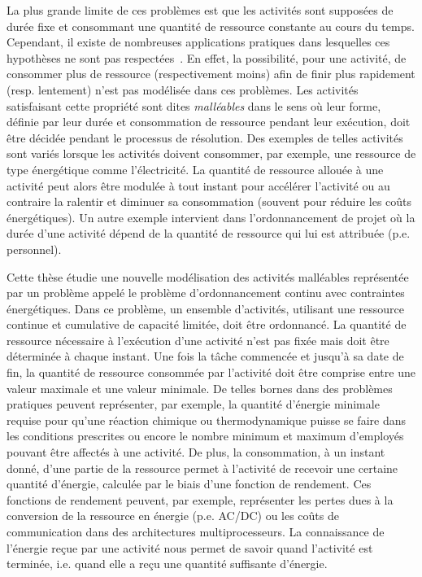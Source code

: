 La plus grande limite de ces problèmes est que les activités sont
supposées de durée fixe et consommant une quantité de ressource
constante au cours du temps. Cependant, il existe de nombreuses
applications pratiques dans lesquelles ces hypothèses ne sont pas
respectées~\cite{HaitArtiguesLopez,Blaz,W80}. En effet, la
possibilité, pour une activité, de consommer plus de ressource
(respectivement moins) afin de finir plus rapidement (resp. lentement)
n'est pas modélisée dans ces problèmes. Les activités satisfaisant
cette propriété sont dites {\it malléables} dans le sens où leur
forme, définie par leur durée et consommation de ressource pendant
leur exécution, doit être décidée pendant le processus de
résolution. Des exemples de telles activités sont variés lorsque les
activités doivent consommer, par exemple, une ressource de type
énergétique comme 
l'électricité.  La quantité de ressource 
allouée à une activité peut alors être modulée à tout instant pour
accélérer l'activité 
ou au contraire la ralentir et diminuer sa consommation (souvent
pour réduire les coûts 
énergétiques). Un autre exemple intervient dans l'ordonnancement de
projet où la durée d'une activité dépend de la quantité de ressource
qui lui est attribuée (p.e. personnel). 

Cette thèse étudie une nouvelle modélisation des activités malléables
représentée par un problème appelé le problème d'ordonnancement
continu avec contraintes énergétiques. Dans ce problème, un ensemble
d'activités,  utilisant une ressource continue et cumulative de
capacité limitée, doit être ordonnancé. La quantité de ressource
nécessaire à l'exécution d'une activité n'est pas fixée mais doit
être déterminée à chaque instant. Une fois la tâche commencée et
jusqu'à sa date de fin, la quantité de ressource consommée par
l'activité doit être comprise entre une valeur maximale et une valeur
minimale. De telles bornes dans des problèmes pratiques
peuvent représenter, par exemple, la quantité d'énergie
minimale requise pour qu'une réaction chimique ou thermodynamique
puisse se faire dans les conditions prescrites ou encore le nombre
minimum et 
maximum d'employés pouvant être affectés à une activité.
De plus, la consommation, à un instant donné, d'une partie
de la ressource permet à l'activité de recevoir une certaine quantité
d'énergie, calculée par le biais d'une fonction de rendement. Ces
fonctions de rendement peuvent, par exemple, représenter les pertes
dues à la conversion de la ressource en énergie (p.e. AC/DC) ou les
coûts de communication dans des architectures multiprocesseurs. 
La connaissance de l'énergie reçue par une activité nous permet de
savoir quand 
l'activité est terminée, i.e. quand elle a reçu une quantité
suffisante d'énergie. 

